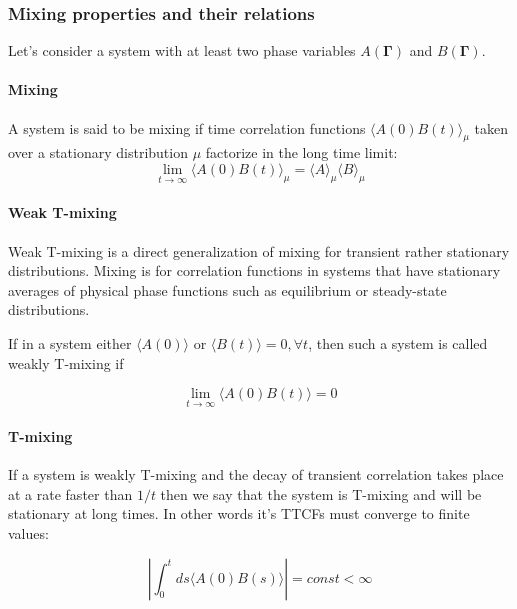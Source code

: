 \documentclass[a4paper,12pt,nofootinbib]{article}
\begin{document}
\subsubsection{Mixing properties and their relations}

Let's consider a system with at least two phase variables $A(\bm{\Gamma})$ and $B(\bm{\Gamma})$. 

\paragraph{Mixing}

A system is said to be mixing if time correlation functions $\langle A(0) B(t) \rangle_{\mu}$ taken over a stationary distribution $\mu$ factorize in the long time limit:
\begin{equation}
  \lim_{t \to \infty} \langle A(0) B(t)\rangle_{\mu} = \langle A \rangle_{\mu} \langle B \rangle_{\mu}  
\end{equation}

\paragraph{Weak T-mixing}
Weak T-mixing is a direct generalization of mixing for transient rather stationary distributions. Mixing is for correlation functions in systems that have stationary averages of physical phase functions such as equilibrium or steady-state distributions.

If in a system either $\langle A(0) \rangle $ or $ \langle B(t) \rangle = 0, \forall t $, then such a system is called weakly T-mixing if

\begin{equation}
  \lim_{t \to \infty} \langle A(0) B(t) \rangle = 0
\end{equation}

\paragraph{T-mixing}
If a system is weakly T-mixing and the decay of transient correlation takes place at a rate faster than $1/t$ then we say that the system is T-mixing and will be stationary at long times. In other words it's TTCFs must converge to finite values:

\begin{equation}
  \left| \int_0^t ds \langle A(0) B(s) \rangle \right| = const < \infty 
\end{equation}
\end{document}
